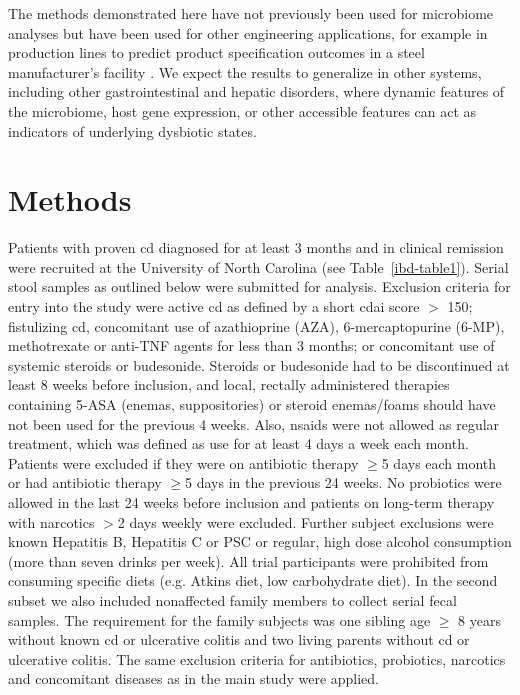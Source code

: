 The methods demonstrated here have not previously been used for microbiome analyses but have been used for other engineering applications, for example in production lines to predict product specification outcomes in a steel manufacturer's facility \cite{RN4216}. We expect the results to generalize in other systems, including other gastrointestinal and hepatic disorders, where dynamic features of the microbiome, host gene expression, or other accessible features can act as indicators of underlying dysbiotic states.

\section{Methods}

Patients with proven \gls{cd} diagnosed for at least 3 months and in clinical remission were recruited at the University of North Carolina (see Table~\ref{ibd-table1}). Serial stool samples as outlined below were submitted for analysis. Exclusion criteria for entry into the study were active \gls{cd} as defined by a short \gls{cdai} score $>$ 150; fistulizing \gls{cd}, concomitant use of azathioprine (AZA), 6-mercaptopurine (6-MP), methotrexate or anti-TNF agents for less than 3 months; or concomitant use of systemic steroids or budesonide. Steroids or budesonide had to be discontinued at least 8 weeks before inclusion, and local, rectally administered therapies containing 5-ASA (enemas, suppositories) or steroid enemas/foams should have not been used for the previous 4 weeks. Also, \glspl{nsaid} were not allowed as regular treatment, which was defined as use for at least 4 days a week each month. Patients were excluded if they were on antibiotic therapy $\geq$5 days each month or had antibiotic therapy $\geq$5 days in the previous 24 weeks. No probiotics were allowed in the last 24 weeks before inclusion and patients on long-term therapy with narcotics $>$2 days weekly were excluded.  Further subject exclusions were known Hepatitis B, Hepatitis C or PSC or regular, high dose alcohol consumption (more than seven drinks per week). All trial participants were prohibited from consuming specific diets (e.g. Atkins diet, low carbohydrate diet). In the second subset we also included nonaffected family members to collect serial fecal samples.  The requirement for the family subjects was one sibling age $\geq$ 8 years without known \gls{cd} or ulcerative colitis and two living parents without \gls{cd} or ulcerative colitis. The same exclusion criteria for antibiotics, probiotics, narcotics and concomitant diseases as in the main study were applied. 

